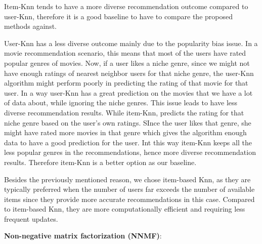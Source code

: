         Item-Knn tends to have a more diverse recommendation outcome compared to user-Knn, therefore it is a good baseline to have to compare the proposed methods against.
        
        User-Knn has a less diverse outcome mainly due to the popularity bias issue. In a movie recommendation scenario, this means that most of the users have rated popular genres of movies. Now, if a user likes a niche genre, since we might not have enough ratings of nearest neighbor users for that niche genre, the user-Knn algorithm might perform poorly in predicting the rating of that movie for that user. In a way user-Knn has a great prediction on the movies that we have a lot of data about, while ignoring the niche genres. This issue leads to have less diverse recommendation results. While item-Knn, predicts the rating for that niche genre based on the user's own ratings. SInce the user likes that genre, she might have rated more movies in that genre which gives the algorithm enough data to have a good prediction for the user. Int this way item-Knn keeps all the less popular genres in the recommendations, hence more diverse recommendation results. Therefore item-Knn is a better option as our baseline.
        
        
        Besides the previously mentioned reason, we chose item-based Knn, as they are typically preferred when the number of users far exceeds the number of available items since they provide more accurate recommendations in this case. Compared to item-based Knn, they are more computationally efficient and requiring less frequent updates.

       
        \textbf{Non-negative matrix factorization (NNMF)}:
       
